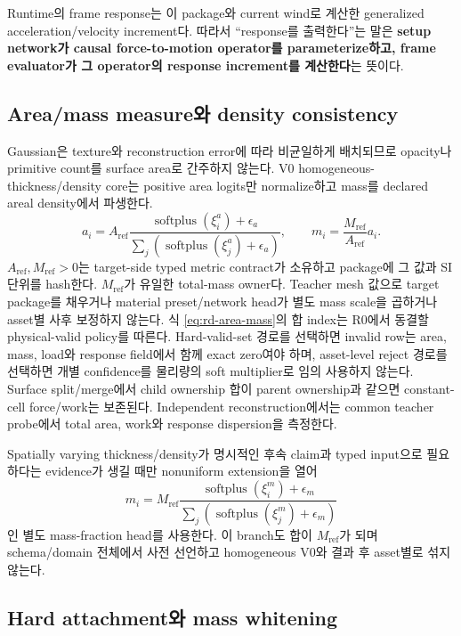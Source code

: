 \documentclass[11pt]{article}
\begin{document}
Runtime의 frame response는 이 package와 current wind로 계산한 generalized acceleration/velocity increment다.
따라서 ``response를 출력한다''는 말은 \textbf{setup network가 causal force-to-motion operator를
parameterize하고, frame evaluator가 그 operator의 response increment를 계산한다}는 뜻이다.

\subsection{Area/mass measure와 density consistency}

Gaussian은 texture와 reconstruction error에 따라 비균일하게 배치되므로 opacity나 primitive count를
surface area로 간주하지 않는다. V0 homogeneous-thickness/density core는 positive area logits만
normalize하고 mass를 declared areal density에서 파생한다.
\begin{equation}
  a_i=A_{\mathrm{ref}}\frac{\operatorname{softplus}(\xi_i^a)+\epsilon_a}
  {\sum_j(\operatorname{softplus}(\xi_j^a)+\epsilon_a)},\qquad
  m_i=\frac{M_{\mathrm{ref}}}{A_{\mathrm{ref}}}a_i.
  \label{eq:rd-area-mass}
\end{equation}
\(A_{\mathrm{ref}},M_{\mathrm{ref}}>0\)는 target-side typed metric contract가 소유하고 package에
그 값과 SI 단위를 hash한다. \(M_{\mathrm{ref}}\)가 유일한 total-mass owner다.
Teacher mesh 값으로 target package를 채우거나 material preset/network head가 별도 mass scale을
곱하거나 asset별 사후 보정하지 않는다.
식 \eqref{eq:rd-area-mass}의 합 index는 R0에서 동결할 physical-valid policy를 따른다.
Hard-valid-set 경로를 선택하면 invalid row는 area, mass, load와 response field에서 함께 exact zero여야 하며,
asset-level reject 경로를 선택하면 개별 confidence를 물리량의 soft multiplier로 임의 사용하지 않는다.
Surface split/merge에서 child ownership 합이 parent ownership과 같으면 constant-cell force/work는 보존된다.
Independent reconstruction에서는 common teacher probe에서 total area, work와 response dispersion을 측정한다.

Spatially varying thickness/density가 명시적인 후속 claim과 typed input으로 필요하다는 evidence가 생길 때만
nonuniform extension을 열어
\[
  m_i=M_{\mathrm{ref}}
  \frac{\operatorname{softplus}(\xi_i^m)+\epsilon_m}
  {\sum_j(\operatorname{softplus}(\xi_j^m)+\epsilon_m)}
\]
인 별도 mass-fraction head를 사용한다. 이 branch도 합이 \(M_{\mathrm{ref}}\)가 되며 schema/domain 전체에서
사전 선언하고 homogeneous V0와 결과 후 asset별로 섞지 않는다.

\subsection{Hard attachment와 mass whitening}
\end{document}
